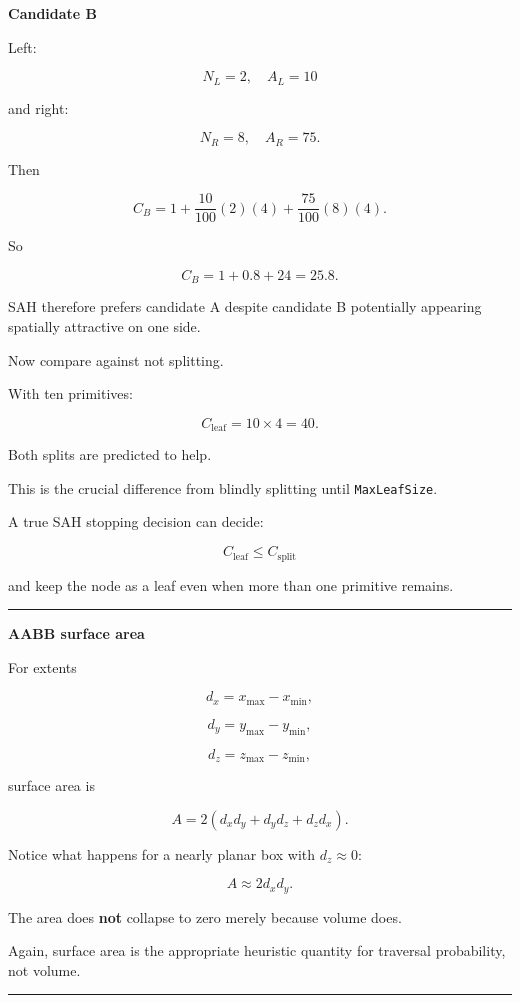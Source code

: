 \textbf{Candidate B}

Left:

\[
N_L=2,\quad A_L=10
\]

and right:

\[
N_R=8,\quad A_R=75.
\]

Then

\[
C_B
=
1+
\frac{10}{100}(2)(4)
+
\frac{75}{100}(8)(4).
\]

So

\[
C_B=1+0.8+24=25.8.
\]

SAH therefore prefers candidate A despite candidate B potentially appearing spatially attractive on one side.

Now compare against not splitting.

With ten primitives:

\[
C_{\text{leaf}}
=
10\times4
=
40.
\]

Both splits are predicted to help.

This is the crucial difference from blindly splitting until \texttt{MaxLeafSize}.

A true SAH stopping decision can decide:

\[
C_{\text{leaf}}
\le C_{\text{split}}
\]

and keep the node as a leaf even when more than one primitive remains.

\begin{center}\rule{0.5\linewidth}{0.5pt}\end{center}

\textbf{AABB surface area}

For extents

\[
d_x=x_{\max}-x_{\min},
\]

\[
d_y=y_{\max}-y_{\min},
\]

\[
d_z=z_{\max}-z_{\min},
\]

surface area is

\[
\boxed{
A=2(d_xd_y+d_yd_z+d_zd_x).
}
\]

Notice what happens for a nearly planar box with \(d_z\approx0\):

\[
A\approx2d_xd_y.
\]

The area does \textbf{not} collapse to zero merely because volume does.

Again, surface area is the appropriate heuristic quantity for traversal probability, not volume.

\begin{center}\rule{0.5\linewidth}{0.5pt}\end{center}

